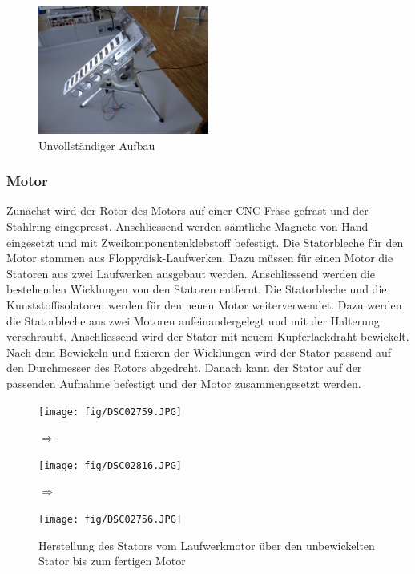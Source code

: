 \begin{figure}[h!]
	\centering
	\includegraphics[width=0.5\textwidth]{fig/IMG_2303.JPG}
	\caption{Unvollständiger Aufbau}
	\label{fig:Unvollständiger Aufbau}
\end{figure}
\FloatBarrier

\subsubsection{Motor}
Zunächst wird der Rotor des Motors auf einer CNC-Fräse gefräst und der 
Stahlring eingepresst. Anschliessend werden sämtliche Magnete von Hand 
eingesetzt und mit Zweikomponentenklebstoff befestigt. Die Statorbleche für 
den Motor stammen aus Floppydisk-Laufwerken. Dazu müssen für einen Motor die 
Statoren aus zwei Laufwerken ausgebaut werden. Anschliessend werden die 
bestehenden Wicklungen von den Statoren entfernt. Die Statorbleche und die 
Kunststoffisolatoren werden für den neuen Motor weiterverwendet. Dazu werden 
die Statorbleche aus zwei Motoren aufeinandergelegt und mit der Halterung 
verschraubt. Anschliessend wird der Stator mit neuem Kupferlackdraht 
bewickelt. Nach dem Bewickeln und fixieren der Wicklungen wird der Stator 
passend auf den Durchmesser des Rotors abgedreht. Danach kann der Stator auf 
der passenden Aufnahme befestigt und der Motor zusammengesetzt werden. 
\begin{figure}[h!]
    \begin{center}
        \begin{minipage}[c]{0.25\textwidth}
            \texttt{[image: fig/DSC02759.JPG]}
        \end{minipage}
        \begin{minipage}[c]{0.05\textwidth}
            \Huge$\Rightarrow$
        \end{minipage}
        \begin{minipage}[c]{0.25\textwidth}
            \texttt{[image: fig/DSC02816.JPG]}
        \end{minipage}
        \begin{minipage}[c]{0.05\textwidth}
            \Huge$\Rightarrow$
        \end{minipage}
        \begin{minipage}[c]{0.25\textwidth}
            \texttt{[image: fig/DSC02756.JPG]}
        \end{minipage}
    \end{center}
    \caption{Herstellung des Stators vom Laufwerkmotor über den unbewickelten Stator bis zum fertigen Motor}
    \label{m_motor_stator}
\end{figure}
\FloatBarrier

